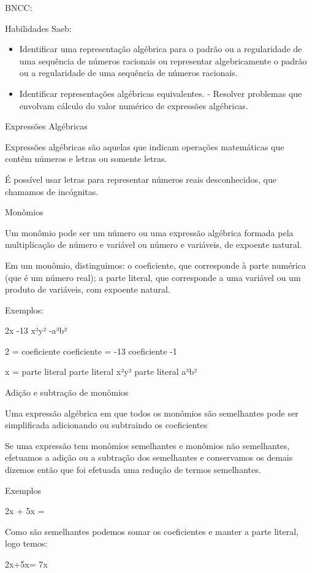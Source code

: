 {BNCC:

Habilidades Saeb:

\begin{itemize}
\item
  Identificar uma representação algébrica para o padrão ou a
  regularidade de uma sequência de números racionais ou representar
  algebricamente o padrão ou a regularidade de uma sequência de números
  racionais.
\item
  Identificar representações algébricas equivalentes. - Resolver
  problemas que envolvam cálculo do valor numérico de expressões
  algébricas.
\end{itemize}

Expressões Algébricas

Expressões algébricas são aquelas que indicam operações matemáticas que
contêm números e letras ou somente letras.

É possível usar letras para representar números reais desconhecidos, que
chamamos de incógnitas.

Monômios

Um monômio pode ser um número ou uma expressão algébrica formada pela
multiplicação de número e variável ou número e variáveis, de expoente
natural.

Em um monômio, distinguimos: o coeficiente, que corresponde à parte
numérica (que é um número real); a parte literal, que corresponde a uma
variável ou um produto de variáveis, com expoente natural.

Exemplos:

2x -13 x²y² -a³b²

2 = coeficiente coeficiente = -13 coeficiente -1

x = parte literal parte literal x²y² parte literal a³b²

Adição e subtração de monômios

Uma expressão algébrica em que todos os monômios são semelhantes pode
ser simplificada adicionando ou subtraindo os coeficientes

Se uma expressão tem monômios semelhantes e monômios não semelhantes,
efetuamos a adição ou a subtração dos semelhantes e conservamos os
demais dizemos então que foi efetuada uma redução de termos semelhantes.

Exemplos

2x + 5x =

Como são semelhantes podemos somar os coeficientes e manter a parte
literal, logo temos:

2x+5x= 7x

}
